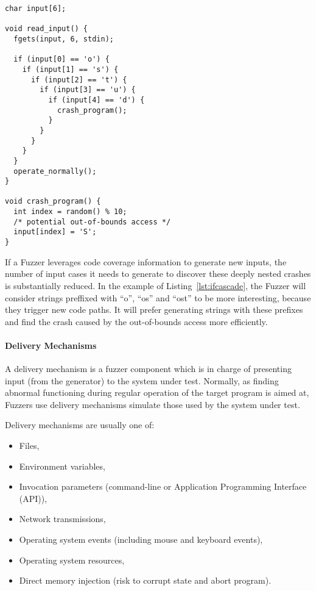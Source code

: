 \begin{lstlisting}[caption={If-Cascade Program}, label={lst:ifcascade},  style=CStyle, float, floatplacement=H]
char input[6];

void read_input() {
  fgets(input, 6, stdin);

  if (input[0] == 'o') {
    if (input[1] == 's') {
      if (input[2] == 't') {
        if (input[3] == 'u') {
          if (input[4] == 'd') {
            crash_program();
          }
        }
      }
    }
  }
  operate_normally();
}

void crash_program() {
  int index = random() % 10;
  /* potential out-of-bounds access */
  input[index] = 'S';
}
\end{lstlisting}

If a Fuzzer leverages code coverage information to generate new inputs, the number of input cases it needs to generate
to discover these deeply nested crashes is substantially reduced. In the example of Listing~\ref{lst:ifcascade}, the Fuzzer will consider strings preffixed
with ``o'', ``os'' and ``ost'' to be more interesting, because they trigger new code paths. It will prefer generating strings with these prefixes and
find the crash caused by the out-of-bounds access more efficiently.


\paragraph{Delivery Mechanisms}

A delivery mechanism is a fuzzer component which is in charge of presenting input (from the generator)
to the system under test. Normally, as finding abnormal functioning during regular operation of the
target program is aimed at, Fuzzers use delivery mechanisms simulate those used by the system under test\cite{mcnallyFuzzingStateArt2012}.

Delivery mechanisms are usually one of:

\begin{itemize}
    \item Files,
    \item Environment variables,
    \item Invocation parameters (command-line or Application Programming Interface (API)),
    \item Network transmissions,
    \item Operating system events (including mouse and keyboard events),
    \item Operating system resources,
    \item Direct memory injection (risk to corrupt state and abort program).
\end{itemize}


